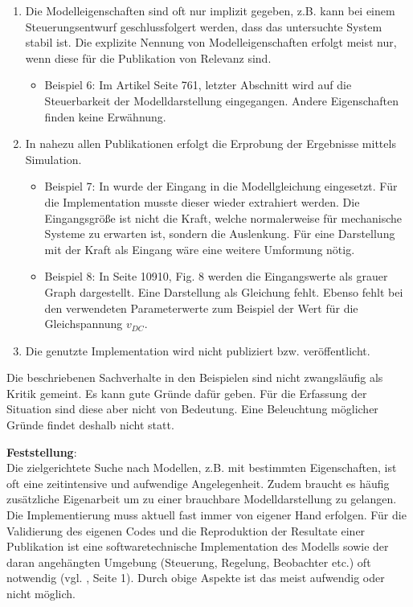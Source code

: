 \begin{enumerate}
	\item  Die Modelleigenschaften sind oft nur implizit gegeben, z.B. kann bei einem Steuerungsentwurf geschlussfolgert werden, dass das untersuchte System stabil ist. Die explizite Nennung von Modelleigenschaften erfolgt meist nur, wenn diese für die Publikation von Relevanz sind. 
	\begin{itemize}[label=$\bullet$]
		\item Beispiel 6: Im Artikel \cite{PEGUEA16} Seite 761, letzter Abschnitt wird auf die Steuerbarkeit der Modelldarstellung eingegangen. Andere Eigenschaften finden keine Erwähnung.
	\end{itemize}
	\item In nahezu allen Publikationen erfolgt die Erprobung der Ergebnisse mittels Simulation. 
	\begin{itemize}[label=$\bullet$]
		\item Beispiel 7: In \cite{BUT21} wurde der Eingang in die Modellgleichung eingesetzt. Für die Implementation musste dieser wieder extrahiert werden. Die Eingangsgröße ist nicht die Kraft, welche normalerweise für mechanische Systeme zu erwarten ist, sondern die Auslenkung. Für eine Darstellung mit der Kraft als Eingang wäre eine weitere Umformung nötig.
		\item Beispiel 8: In \cite{FEGE18} Seite 10910, Fig. 8 werden die Eingangswerte als grauer Graph dargestellt. Eine Darstellung als Gleichung fehlt. Ebenso fehlt bei den verwendeten Parameterwerte zum Beispiel der Wert für die Gleichspannung $v_{DC}$.
	\end{itemize}
	\item Die genutzte Implementation wird nicht publiziert bzw. veröffentlicht.
\end{enumerate}
Die beschriebenen Sachverhalte in den Beispielen sind nicht zwangsläufig als Kritik gemeint. Es kann gute Gründe dafür geben. Für die Erfassung der Situation sind diese aber nicht von Bedeutung. Eine Beleuchtung möglicher Gründe findet deshalb nicht statt.

\textbf{Feststellung}:\\
Die zielgerichtete Suche nach Modellen, z.B. mit bestimmten Eigenschaften, ist oft eine zeitintensive und aufwendige Angelegenheit. Zudem braucht es häufig zusätzliche Eigenarbeit um zu einer brauchbare Modelldarstellung zu gelangen. Die Implementierung muss aktuell fast immer von eigener Hand erfolgen. Für die Validierung des eigenen Codes und die Reproduktion der Resultate einer Publikation ist eine softwaretechnische Implementation des Modells sowie der daran angehängten Umgebung (Steuerung, Regelung, Beobachter etc.) oft notwendig (vgl. \cite{KNHE20}, Seite 1). Durch obige Aspekte ist das meist aufwendig oder nicht möglich.

